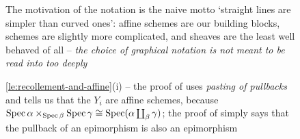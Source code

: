 

        \begin{figure}[h!]
            \centering
            \caption{The motivation of the notation is the naive motto `straight lines are simpler than curved ones': affine schemes are our building blocks, schemes are slightly more complicated, and sheaves are the least well behaved of all -- \emph{the choice of graphical notation is not meant to be read into too deeply}}
            \label{fg:diagram-key}
        \end{figure}

        \begin{figure}[h!]
            \centering
            \caption{\cref{le:recollement-and-affine}(i) -- the proof of  uses \emph{pasting of pullbacks} and tells us that the $Y_i$ are affine schemes, because $\operatorname{Spec}\alpha\times_{\operatorname{Spec}\beta}\operatorname{Spec}\gamma\cong\operatorname{Spec}(\alpha\coprod_\beta\gamma)$; the proof of  simply says that the pullback of an epimorphism is also an epimorphism}\label{fg:recollement-affine-i}
        \end{figure}


